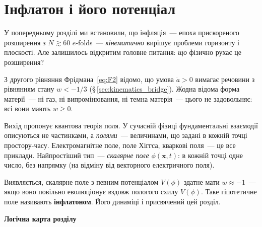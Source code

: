 

\chapter{Інфлатон і його потенціал}
\label{sec:inflaton}

У попередньому розділі ми встановили, що інфляція~---
епоха прискореного розширення з $N \gtrsim 60$ $e$-folds~---
\emph{кінематично} вирішує проблеми горизонту і плоскості.
Але залишилось відкритим головне питання: \emph{що} фізично
рухає це розширення?

З другого рівняння Фрідмана~\eqref{eq:F2} відомо, що умова
$\ddot{a} > 0$ вимагає речовини з рівнянням стану $w < -1/3$
(§\,\ref{sec:kinematics_bridge}). Жодна відома форма матерії~---
ні газ, ні випромінювання, ні темна матерія~--- цього не
задовольняє: всі вони мають $w \geq 0$.

Вихід пропонує квантова теорія поля. У сучасній фізиці
фундаментальні взаємодії описуються не частинками, а
\emph{полями}~--- величинами, що задані в кожній точці
простору-часу. Електромагнітне поле, поле Хіггса, кваркові
поля~--- це все приклади. Найпростіший тип~--- \emph{скалярне
поле} $\phi(\mathbf{x},t)$: в кожній точці одне число, без
напрямку (на відміну від векторного електричного поля).

Виявляється, скалярне поле з певним потенціалом $V(\phi)$
здатне мати $w \approx -1$~--- якщо воно повільно еволюціонує
вздовж пологого схилу $V(\phi)$. Таке гіпотетичне поле
називають \textbf{інфлатоном}. Його динаміці і присвячений
цей розділ.


\medskip
\noindent\textbf{Логічна карта розділу}

